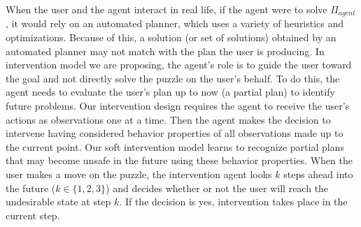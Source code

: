 When the user and the agent interact in real life, if the agent were to solve $\Pi_{agent}$, it would rely on an automated planner, which uses a variety of heuristics and optimizations. Because of this, a solution (or set of solutions) obtained by an automated planner may not match with the plan the user is producing. In intervention model we are proposing, the agent's role is to guide the user toward the goal and not directly solve the puzzle on the user's behalf. To do this, the agent needs to evaluate the user's plan up to now (a partial plan) to identify future problems. Our intervention design requires the agent to receive the user's actions as observations one at a time. Then the agent makes the decision to intervene having considered behavior properties of all observations made up to the current point. Our soft intervention model learns to recognize partial plans that may become unsafe in the future using these behavior properties. When the user makes a move on the puzzle, the intervention agent looks $k$ steps ahead into the future ($k \in \lbrace1,2,3\rbrace$) and decides whether or not the user will reach the undesirable state at step $k$. If the decision is yes, intervention takes place in the current step.
 
